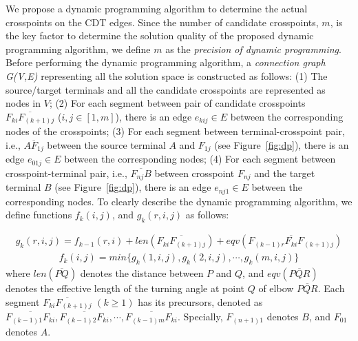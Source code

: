 \documentclass[journal]{IEEEtran}
\begin{document}
We propose a dynamic programming algorithm to determine the actual crosspoints on the CDT edges.
Since the number of candidate crosspoints, $m$, is the key factor to determine the solution quality of the proposed dynamic programming algorithm, we define $m$ as the {\em precision of dynamic programming}. 
Before performing the dynamic programming algorithm, a {\em connection graph G(V,E)} representing all the solution space is constructed as follows: (1) The source/target terminals and all the candidate crosspoints are represented as nodes in $V$; (2) For each segment between pair of candidate crosspoints $\overline{F_{ki}F_{(k+1)j}}$ ($i,j \in [1,m]$), there is an edge $e_{kij} \in E$ between the corresponding nodes of the crosspoints; (3) For each segment between terminal-crosspoint pair, i.e., $\overline{AF_{1j}}$ between the source terminal $A$ and $F_{1j}$ (see Figure~\ref{fig:dp}), there is an edge $e_{01j} \in E$ between the corresponding nodes; (4) For each segment between crosspoint-terminal pair, i.e., $\overline{F_{nj}B}$ between crosspoint $F_{nj}$ and the target terminal $B$ (see Figure~\ref{fig:dp}), there is an edge $e_{nj1} \in E$ between the corresponding nodes. To clearly describe the dynamic programming algorithm, we define functions $f_k(i, j)$, and $g_k(r, i, j)$ as follows:


\begin{equation}\label{eqn:dp1}
\begin{split}
g_k(r, i, j) = f_{k-1}(r, i) + len(\overline{F_{ki}F_{(k+1)j}}) + eqv(\overline{F_{(k-1)r}F_{ki}F_{(k+1)j}})
\end{split}
\end{equation}
\begin{equation}\label{eqn:dp1}
\begin{split}
f_k(i, j) = min\{g_k(1, i, j), g_k(2, i, j), \cdots, g_k(m, i, j)\}
\end{split}
\end{equation}
\noindent where $len(\overline{PQ})$ denotes the distance between $P$ and $Q$, and $eqv(\overline{PQR})$ denotes the effective length of the turning angle at point $Q$ of elbow $\overline{PQR}$. 
Each segment $\overline{F_{ki}F_{(k+1)j}}$ $(k \geq 1)$ has its precursors, denoted as $\overline{F_{(k-1)1}F_{ki}}, \overline{F_{(k-1)2}F_{ki}}, \cdots, \overline{F_{(k-1)m}F_{ki}}$.
Specially, $F_{(n+1)1}$ denotes $B$, and $F_{01}$ denotes $A$. 
\end{document}
